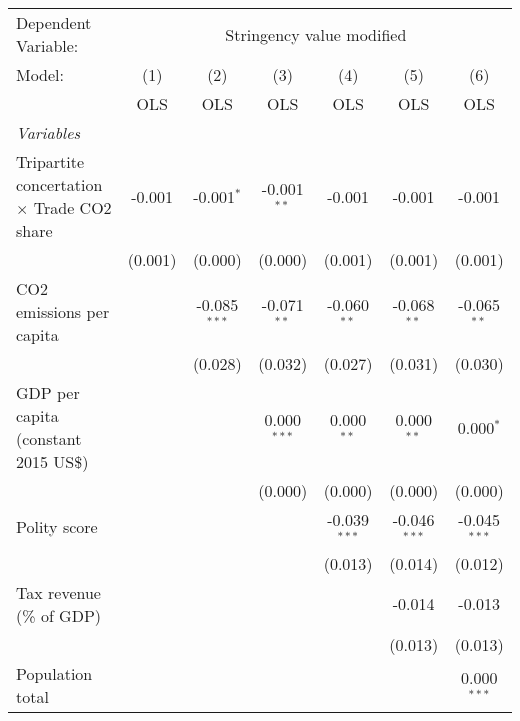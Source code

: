 
\begingroup
\centering
\begin{tabular}{lcccccc}
   \toprule
   Dependent Variable: & \multicolumn{6}{c}{Stringency value modified}\\
   Model:                                            & (1)     & (2)            & (3)           & (4)            & (5)            & (6)\\  
                                                     &  OLS    & OLS            & OLS           & OLS            & OLS            & OLS\\  
   \midrule
   \emph{Variables}\\
   Tripartite concertation $\times$ Trade CO2 share  & -0.001  & -0.001$^{*}$   & -0.001$^{**}$ & -0.001         & -0.001         & -0.001\\   
                                                     & (0.001) & (0.000)        & (0.000)       & (0.001)        & (0.001)        & (0.001)\\   
   CO2 emissions per capita                          &         & -0.085$^{***}$ & -0.071$^{**}$ & -0.060$^{**}$  & -0.068$^{**}$  & -0.065$^{**}$\\   
                                                     &         & (0.028)        & (0.032)       & (0.027)        & (0.031)        & (0.030)\\   
   GDP per capita (constant 2015 US\$)               &         &                & 0.000$^{***}$ & 0.000$^{**}$   & 0.000$^{**}$   & 0.000$^{*}$\\   
                                                     &         &                & (0.000)       & (0.000)        & (0.000)        & (0.000)\\   
   Polity score                                      &         &                &               & -0.039$^{***}$ & -0.046$^{***}$ & -0.045$^{***}$\\   
                                                     &         &                &               & (0.013)        & (0.014)        & (0.012)\\   
   Tax revenue (\% of GDP)                           &         &                &               &                & -0.014         & -0.013\\   
                                                     &         &                &               &                & (0.013)        & (0.013)\\   
   Population total                                  &         &                &               &                &                & 0.000$^{***}$\\   

\end{tabular}

